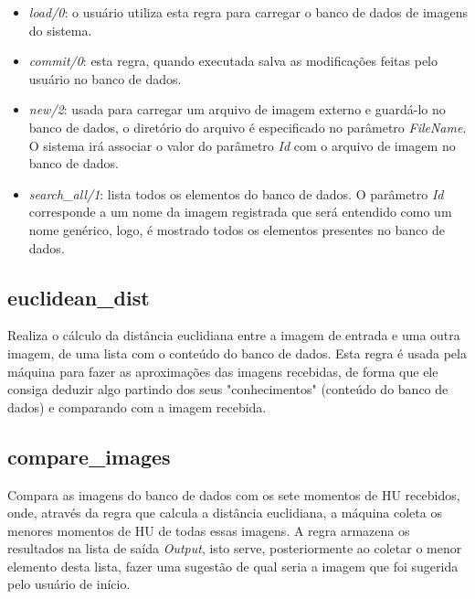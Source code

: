 \documentclass{article}
\begin{document}
        \begin{itemize}
            \item \textit{load/0}: o usuário utiliza esta regra para carregar o
                banco de dados de imagens do sistema.
            
            \item \textit{commit/0}: esta regra, quando executada salva as
                modificações feitas pelo usuário no banco de dados.
            
            \item \textit{new/2}: usada para carregar um arquivo de imagem
                externo e guardá-lo no banco de dados, o diretório do arquivo é
                especificado no parâmetro \textit{FileName}. O sistema irá
                associar o valor do parâmetro \textit{Id} com o arquivo de
                imagem no banco de dados.
            
            \item \textit{search\_all/1}: lista todos os elementos do banco de
                dados. O parâmetro \textit{Id} corresponde a um nome da imagem
                registrada que será entendido como um nome genérico, logo, é
                mostrado todos os elementos presentes no banco de dados.
        \end{itemize}
        
    \newpage
    \subsection*{euclidean\_dist}
        Realiza o cálculo da distância euclidiana entre a imagem de entrada e
        uma outra imagem, de uma lista com o conteúdo do banco de dados. Esta
        regra é usada pela máquina para fazer as aproximações das imagens
        recebidas, de forma que ele consiga deduzir algo partindo dos seus
        "conhecimentos" (conteúdo do banco de dados) e comparando com a imagem
        recebida.
    
    \subsection*{compare\_images}
        Compara as imagens do banco de dados com os sete momentos de HU
        recebidos, onde, através da regra que calcula a distância euclidiana, a
        máquina coleta os menores momentos de HU de todas essas imagens. A
        regra armazena os resultados na lista de saída \textit{Output}, isto
        serve, posteriormente ao coletar o menor elemento desta lista, fazer
        uma sugestão de qual seria a imagem que foi sugerida pelo usuário de
        início.
    
\end{document}
